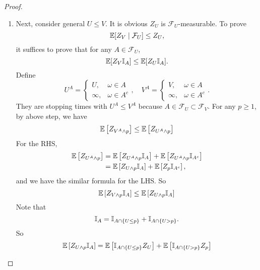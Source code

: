 \begin{proof}
\begin{enumerate}[label=(\roman*)]
        \item Next, consider general $U \leq V$. It is obvious $Z_U$ is $\mathcal{F}_U$-measurable. To prove
        \begin{equation*}
            \mathbb{E}[Z_V \mid \mathcal{F}_U] \leq Z_U,
        \end{equation*}
        it suffices to prove that for any $A \in \mathcal{F}_U$,
        \begin{equation*}
            \mathbb{E}[Z_V \mathbb{I}_A] \leq \mathbb{E}[Z_U\mathbb{I}_A].
        \end{equation*}
        Define
        \begin{equation*}
            U^A = \begin{cases}
                U,& \omega \in A \\
                \infty,&\omega \in A^c
            \end{cases},\quad V^A = \begin{cases}
                V,& \omega \in A \\
                \infty,&\omega \in A^c
            \end{cases}.
        \end{equation*}
        They are stopping times with $U^A \leq V^A$ because $A \in \mathcal{F}_U \subset \mathcal{F}_V$. For any $p \geq 1$, by above step, we have
        \begin{equation*}
            \mathbb{E}\left[Z_{V^A \wedge p}\right] \leq \mathbb{E}\left[Z_{U^A \wedge p}\right]
        \end{equation*}
        For the RHS,
        \begin{align*}
            \mathbb{E}\left[Z_{U^A \wedge p}\right] &= \mathbb{E}\left[Z_{U^A \wedge p}\mathbb{I}_A\right] + \mathbb{E}\left[Z_{U^A \wedge p}\mathbb{I}_{A^c}\right] \\
            &= \mathbb{E}\left[Z_{U \wedge p}\mathbb{I}_A\right] + \mathbb{E}\left[Z_p\mathbb{I}_{A^c}\right],
        \end{align*}
        and we have the similar formula for the LHS. So
        \begin{equation*}
            \mathbb{E}\left[Z_{V \wedge p}\mathbb{I}_A\right] \leq \mathbb{E}\left[Z_{U \wedge p}\mathbb{I}_A\right]
        \end{equation*}
        Note that
        \begin{equation*}
            \mathbb{I}_A = \mathbb{I}_{A\cap \left\{U \leq p\right\}} + \mathbb{I}_{A\cap \left\{U > p\right\}}.
        \end{equation*}
        So
        \begin{equation*}
            \E\bj{Z_{U \wedge p}\mathbb{I}_A} = \E\bj{\mathbb{I}_{A\cap \bb{U \leq p}}Z_U} + \E\bj{\mathbb{I}_{A\cap \bb{U > p}}Z_p}

\end{equation*}
\end{enumerate}
\end{proof}
